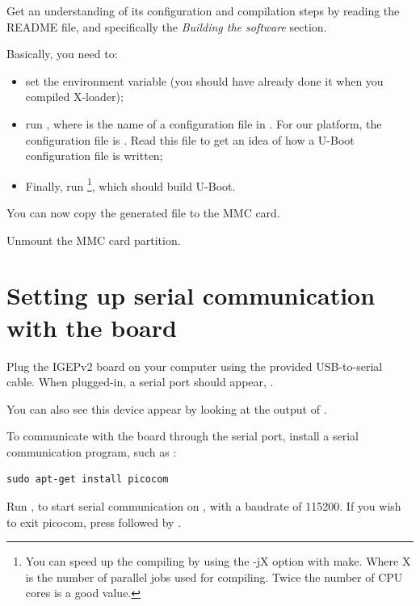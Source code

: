 Get an understanding of its configuration and compilation steps by
reading the README file, and specifically the {\em Building the
  software} section.

Basically, you need to:

\begin{itemize}

\item set the  environment variable (you should
  have already done it when you compiled X-loader);

\item run , where  is the name
  of a configuration file in . For our
  platform, the configuration file is
  . Read this file to get an idea of
  how a U-Boot configuration file is written;

\item Finally, run \footnote{You can speed up the compiling
  by using the -jX option with make. Where X is the number of parallel
  jobs used for compiling. Twice the number of CPU cores is a good
  value.}, which should build U-Boot.

\end{itemize}

You can now copy the generated  file to the MMC card.

Unmount the MMC card partition.

\section{Setting up serial communication with the board}

Plug the IGEPv2 board on your computer using the provided
USB-to-serial cable. When plugged-in, a serial port should appear,
.

You can also see this device appear by looking at the output of
.

To communicate with the board through the serial port, install a
serial communication program, such as :

\begin{verbatim}
sudo apt-get install picocom
\end{verbatim}

Run , to start serial
communication on , with a baudrate of 115200. If
you wish to exit picocom, press \code{[Ctrl][a]} followed by
\code{[Ctrl][x]}.

